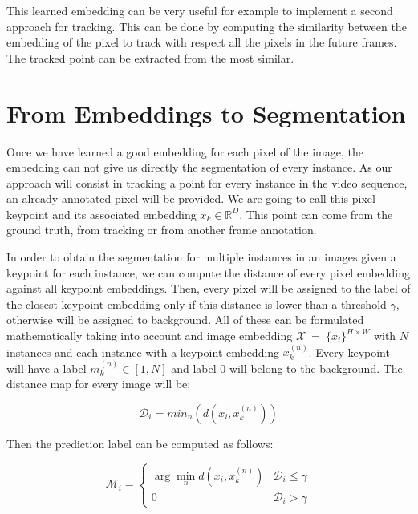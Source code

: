This learned embedding can be very useful for example to implement a second approach for tracking.
This can be done by computing the similarity between the embedding of the pixel to track with respect all the pixels in the future frames.
The tracked point can be extracted from the most similar.



\section{From Embeddings to Segmentation}
\label{sec:methods:embeddingsegmentation}

Once we have learned a good embedding for each pixel of the image, the embedding can not give us directly the segmentation of every instance.
As our approach will consist in tracking a point for every instance in the video sequence, an already annotated pixel will be provided.
We are going to call this pixel keypoint and its associated embedding $x_k \in \mathbb{R}^D$.
This point can come from the ground truth, from tracking or from another frame annotation.

In order to obtain the segmentation for multiple instances in an images given a keypoint for each instance, we can compute the distance of every pixel embedding against all keypoint embeddings.
Then, every pixel will be assigned to the label of the closest keypoint embedding only if this distance is lower than a threshold $\gamma$, otherwise will be assigned to background.
All of these can be formulated mathematically taking into account and image embedding $\mathcal{X}~=~\{x_i\}^{H \times W}$ with $N$ instances and each instance with a keypoint embedding $x_k^{(n)}$.
Every keypoint will have a label $m_k^{(n)} \in [1, N]$ and label $0$ will belong to the background.
The distance map for every image will be:

\begin{equation}
  \mathcal{D}_i = min_n \left( d(x_i, x_k^{(n)}) \right)
\end{equation}

Then the prediction label can be computed as follows:

\begin{equation}
  \mathcal{M}_i = \begin{cases}
      \arg\min_n d(x_i, x_k^{(n)}) & \mathcal{D}_i \leq \gamma \\
      0 & \mathcal{D}_i > \gamma
   \end{cases}
\end{equation}

